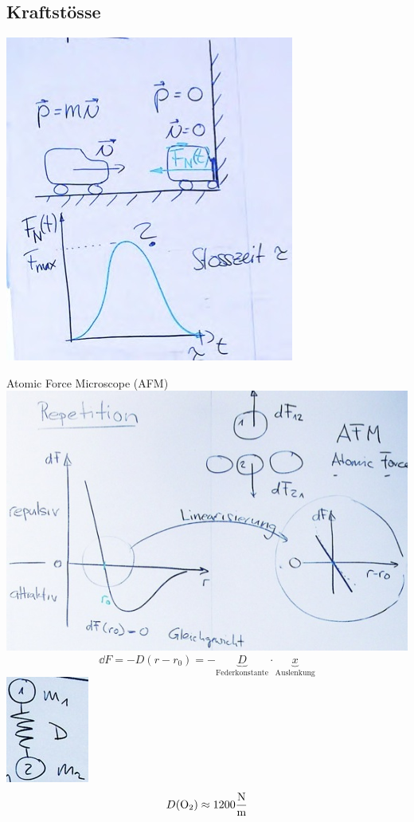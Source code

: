\subsection{Kraftstösse}
\includegraphics{Bild30}
\begin{rep*}
	Atomic Force Microscope (AFM) \\
	\includegraphics{Bild31}
	\[ \dd F =  -D ( r - r_0 ) = -\underbrace{D}_{\text{Federkonstante}} \cdot \underbrace{x}_{\text{Auslenkung}} \]
	\includegraphics{Bild32}
	\[ D( \ce{O2} ) \approx 1200 \frac{\text{N}}{\text{m}} \]
\end{rep*}
